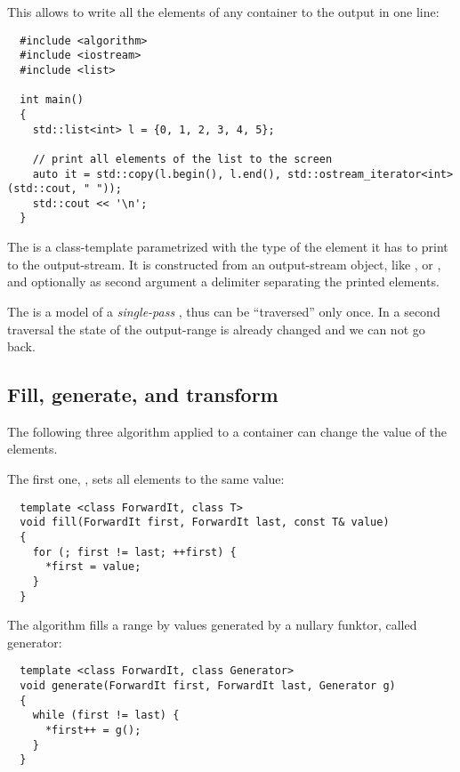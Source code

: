 This allows to write all the elements of any container to the output in one line:
\begin{verbatim}
  #include <algorithm>
  #include <iostream>
  #include <list>

  int main()
  {
    std::list<int> l = {0, 1, 2, 3, 4, 5};

    // print all elements of the list to the screen
    auto it = std::copy(l.begin(), l.end(), std::ostream_iterator<int>(std::cout, " "));
    std::cout << '\n';
  }
\end{verbatim}
%
The  is a class-template parametrized with the type of the element it has to print to the output-stream. It is
constructed from an output-stream object, like ,  or , and optionally as second argument
a delimiter separating the printed elements.

The  is a model of a \emph{single-pass} , thus can be ``traversed'' only once. In a second traversal
the state of the output-range is already changed and we can not go back.


\subsection{Fill, generate, and transform}
The following three algorithm applied to a container can change the value of the elements.

The first one, , sets all elements to the same value:
%
\begin{samepage}
\begin{verbatim}
  template <class ForwardIt, class T>
  void fill(ForwardIt first, ForwardIt last, const T& value)
  {
    for (; first != last; ++first) {
      *first = value;
    }
  }
\end{verbatim}
\end{samepage}

The algorithm  fills a range by values generated by a nullary funktor, called generator:
%
\begin{samepage}
\begin{verbatim}
  template <class ForwardIt, class Generator>
  void generate(ForwardIt first, ForwardIt last, Generator g)
  {
    while (first != last) {
      *first++ = g();
    }
  }
\end{verbatim}
\end{samepage}

